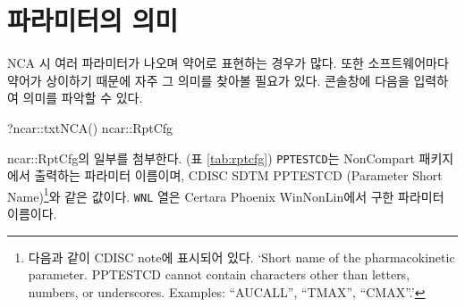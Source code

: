 \documentclass[
  11pt,
  krantz2, a4paper, twoside]{krantz}
\newenvironment{Shaded}{\begin{snugshade}}{\end{snugshade}}
\newcommand{\FunctionTok}[1]{\textcolor[rgb]{0.00,0.00,0.00}{#1}}
\newcommand{\NormalTok}[1]{#1}
\newcommand{\SpecialCharTok}[1]{\textcolor[rgb]{0.00,0.00,0.00}{#1}}
\theoremstyle{definition}
\theoremstyle{definition}
\theoremstyle{definition}
\theoremstyle{definition}
\theoremstyle{remark}
\begin{document}
\hypertarget{parameters}{%
\section{파라미터의 의미}\label{parameters}}

NCA 시 여러 파라미터가 나오며 약어로 표현하는 경우가 많다. 또한 소프트웨어마다 약어가 상이하기 때문에 자주 그 의미를 찾아볼 필요가 있다. 콘솔창에 다음을 입력하여 의미를 파악할 수 있다.

\begin{Shaded}
\begin{Highlighting}[]
\NormalTok{?ncar}\SpecialCharTok{::}\FunctionTok{txtNCA}\NormalTok{()}
\NormalTok{ncar}\SpecialCharTok{::}\NormalTok{RptCfg}
\end{Highlighting}
\end{Shaded}

ncar::RptCfg의 일부를 첨부한다. (표 \ref{tab:rptcfg}) \texttt{PPTESTCD}는 NonCompart 패키지에서 출력하는 파라미터 이름이며, CDISC SDTM PPTESTCD (Parameter Short Name)\footnote{다음과 같이 CDISC note에 표시되어 있다. `Short name of the pharmacokinetic parameter. PPTESTCD cannot contain characters other than letters, numbers, or underscores. Examples: ``AUCALL'', ``TMAX'', ``CMAX''.'}와 같은 값이다. \texttt{WNL} 열은 Certara Phoenix WinNonLin에서 구한 파라미터 이름이다.
\end{document}
